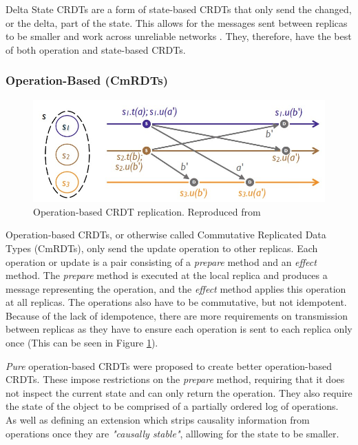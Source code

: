 \documentclass[12pt]{article}
\begin{document}
Delta State CRDTs are a form of state-based CRDTs that only send the changed, or the delta, part of the state. This allows for the messages sent between replicas to be smaller and work across unreliable networks \cite{Almeida_2018}. They, therefore, have the best of both operation and state-based CRDTs.


\subsubsection{Operation-Based (CmRDTs)}

\begin{figure}
    \centering
    \includegraphics[width=8 cm]{operation.jpg}
    \caption{Operation-based CRDT replication. Reproduced from \cite{10.1007/978-3-642-24550-3_29}}
    \label{fig:operation}
\end{figure}

Operation-based CRDTs, or otherwise called Commutative Replicated Data Types (CmRDTs), only send the update operation to other replicas. Each operation or update is a pair consisting of a \textit{prepare} method and an \textit{effect} method. The \textit{prepare} method is executed at the local replica and produces a message representing the operation, and the \textit{effect} method applies this operation at all replicas\cite{10.1007/978-3-642-24550-3_29}. The operations also have to be commutative, but not idempotent. Because of the lack of idempotence, there are more requirements on transmission between replicas as they have to ensure each operation is sent to each replica only once (This can be seen in Figure \ref{fig:operation}). \par

\textit{Pure} operation-based CRDTs were proposed to create better operation-based CRDTs\cite{10.1007/978-3-662-43352-2_11}. These impose restrictions on the \textit{prepare} method, requiring that it does not inspect the current state and can only return the operation. They also require the state of the object to be comprised of a partially ordered log of operations. As well as defining an extension which strips causality information from operations once they are \textit{"causally stable"}\cite{10.1007/978-3-662-43352-2_11}, alllowing for the state to be smaller.
\end{document}
